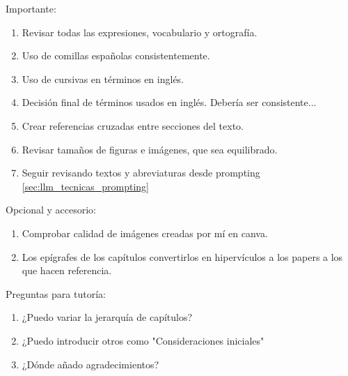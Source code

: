 
\newpage
\pagecolor{yellow!30}
Importante:
  \begin{enumerate}
    \item Revisar todas las expresiones, vocabulario y ortografía.
    \item Uso de comillas españolas consistentemente.
    \item Uso de cursivas en términos en inglés.
    \item Decisión final de términos usados en inglés. Debería ser consistente...
    \item Crear referencias cruzadas entre secciones del texto.
    \item Revisar tamaños de figuras e imágenes, que sea equilibrado.
    \item Seguir revisando textos y abreviaturas desde prompting \ref{sec:llm_tecnicas_prompting}
  \end{enumerate}

  
  Opcional y accesorio:
  \begin{enumerate}
    \item Comprobar calidad de imágenes creadas por mí en canva.
    \item Los epígrafes de los capítulos convertirlos en hipervículos a los papers a los que hacen referencia.
  \end{enumerate}




Preguntas para tutoría:
\begin{enumerate}
  \item ¿Puedo variar la jerarquía de capítulos?
  \item ¿Puedo introducir otros como "Consideraciones iniciales"
  \item ¿Dónde añado agradecimientos?
\end{enumerate}
\clearpage
\nopagecolor


